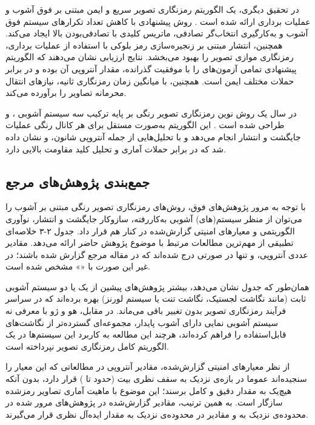 در تحقیق دیگری، یک الگوریتم رمزنگاری تصویر سریع و ایمن مبتنی بر فوق آشوب و عملیات برداری ارائه شده است \cite{ref12}. روش پیشنهادی با کاهش تعداد تکرارهای سیستم فوق آشوب و به‌کارگیری انتخاب‌گر تصادفی، ماتریس کلیدی با تصادفی‌بودن بالا ایجاد می‌کند. همچنین، انتشار مبتنی بر زنجیره‌سازی رمز بلوکی با استفاده از عملیات برداری، رمزنگاری موازی تصویر را بهبود می‌بخشد. نتایج ارزیابی نشان می‌دهند که الگوریتم پیشنهادی تمامی آزمون‌های   را با موفقیت گذرانده، مقدار آنتروپی آن  بوده و در برابر حملات مختلف ایمن است. همچنین، با میانگین زمان رمزنگاری  ثانیه، نیازهای انتقال محرمانه تصاویر را برآورده می‌کند.

در سال  یک روش نوین رمزنگاری تصویر رنگی بر پایه ترکیب سه سیستم آشوبی ،  و  طراحی شده است \cite{ref13}. این الگوریتم به‌صورت مستقل برای هر کانال رنگی عملیات جایگشت و انتشار انجام می‌دهد و با تحلیل‌هایی از جمله آنتروپی شانون،  و  نشان داده شد که در برابر حملات آماری و تحلیل کلید مقاومت بالایی دارد.

\subsection{جمع‌بندی پژوهش‌های مرجع}

با توجه به مرور پژوهش‌های فوق، روش‌های رمزنگاری تصویر رنگی مبتنی بر آشوب را می‌توان از منظر سیستم(های) آشوبی به‌کاررفته، سازوکار جایگشت و انتشار، نوآوری الگوریتمی و معیارهای امنیتی گزارش‌شده در کنار هم قرار داد. جدول ۲-۳ خلاصه‌ای تطبیقی از مهم‌ترین مطالعات مرتبط با موضوع پژوهش حاضر ارائه می‌دهد. مقادیر عددی آنتروپی،  و  تنها در صورتی درج شده‌اند که در مقاله مرجع گزارش شده باشند؛ در غیر این صورت با «\lr{---}» مشخص شده است.

همان‌طور که جدول نشان می‌دهد، بیشتر پژوهش‌های پیشین از یک یا دو سیستم آشوبی ثابت (مانند نگاشت لجستیک، نگاشت تنت یا سیستم لورنز) بهره برده‌اند که در سراسر فرآیند رمزنگاری تصویر بدون تغییر باقی می‌ماند. در مقابل، هو و ژو \cite{ref4} با معرفی نه سیستم آشوبی نمایی دارای آشوب پایدار، مجموعه‌ای گسترده‌تر از نگاشت‌های قابل‌استفاده را فراهم کرده‌اند، هرچند این مطالعه به کاربرد این سیستم‌ها در یک الگوریتم کامل رمزنگاری تصویر نپرداخته است.

از نظر معیارهای امنیتی گزارش‌شده، مقادیر آنتروپی در مطالعاتی که این معیار را سنجیده‌اند عموما در بازه‌ی نزدیک به سقف نظری  بیت (حدود  تا ) قرار دارد، بدون آنکه هیچ‌یک به مقدار دقیق و کامل  برسند؛ این موضوع با ماهیت آماری تصاویر رمزشده سازگار است. به همین ترتیب، مقادیر  گزارش‌شده در پژوهش‌های مرور شده در محدوده‌ی نزدیک به  و مقادیر  در محدوده‌ی نزدیک به مقدار ایده‌آل نظری  قرار می‌گیرند.

